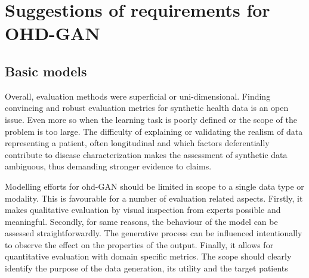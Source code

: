 \section{Suggestions of requirements for OHD-GAN}

\subsection{Basic models}\label{sec:basic}
Overall, evaluation methods were superficial or uni-dimensional. Finding convincing and robust evaluation metrics for synthetic health data is an open issue. Even more so when the learning task is poorly defined or the scope of the problem is too large. The difficulty of explaining or validating the realism of data representing a patient, often longitudinal and which factors deferentially contribute to disease characterization makes the assessment of synthetic data ambiguous, thus demanding stronger evidence to claims.\par
Modelling efforts for \gls{ohd}-GAN should be limited in scope to a single data type or modality. This is favourable for a number of evaluation related aspects. Firstly, it makes qualitative evaluation by visual inspection from experts possible and meaningful. Secondly, for same reasons, the behaviour of the model can be assessed straightforwardly. The generative process can be influenced intentionally to observe the effect on the properties of the output. Finally, it allows for quantitative evaluation with domain specific metrics. The scope should clearly identify the purpose of the data generation, its utility and the target patients\cite{Capobianco2020,Kappen_2016, Kappen_2016a}


